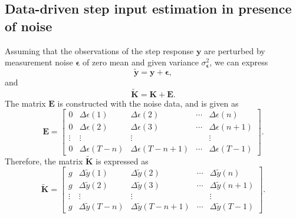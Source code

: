 \subsection{Data-driven step input estimation in presence of noise}

Assuming that the observations of the step response $\mathbf{y}$ are perturbed by measurement noise $\bm{\epsilon}$ of zero mean and given variance $\sigma_{\bm{\epsilon}}^2$, we can express 
\begin{equation} \widetilde{\mathbf{y}} = \mathbf{y} + \bm{\epsilon} , \label{eqn:y0plusnoise} \end{equation} 
and
\begin{equation} \widetilde{\mathbf{K}} = \mathbf{K} + \mathbf{E} . \label{eqn:K0plusnoise} \end{equation}The matrix $\mathbf{E}$ is constructed with the noise data, and is given as
\begin{equation} \mathbf{E} = \begin{bmatrix} 0 & \Delta \epsilon(1) & \Delta \epsilon(2) & \cdots & \Delta \epsilon(n) \\ 0 & \Delta \epsilon(2) & \Delta \epsilon(3) & \cdots & \Delta \epsilon(n+1) \\ \vdots & \vdots & \vdots & & \vdots \\ 0 & \Delta \epsilon(T-n) & \Delta \epsilon(T-n+1) & \cdots & \Delta \epsilon(T-1) \end{bmatrix} . \label{eqn:matrixE} \end{equation}
Therefore, the matrix $\widetilde{\mathbf{K}}$ is expressed as
\begin{equation} \widetilde{\mathbf{K}} = \begin{bmatrix} g & \Delta \widetilde{y}(1) & \Delta \widetilde{y}(2) & \cdots & \Delta \widetilde{y}(n) \\ g & \Delta \widetilde{y}(2) & \Delta \widetilde{y}(3) & \cdots & \Delta \widetilde{y}(n+1) \\ \vdots & \vdots & \vdots & & \vdots \\ g & \Delta \widetilde{y}(T-n) & \Delta \widetilde{y}(T-n+1) & \cdots & \Delta \widetilde{y}(T-1) \end{bmatrix} . \label{eqn:matrixK} \end{equation}

